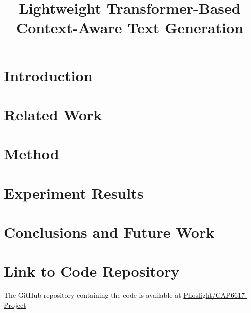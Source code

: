 \documentclass[conference]{IEEEtran}
\begin{document}
\title{Lightweight Transformer-Based Context-Aware Text Generation}


\author{
\and
{}
}

\maketitle

\section{Introduction}\label{sec:introduction}


\section{Related Work}\label{sec:related-work}


\section{Method}\label{sec:method}


\section{Experiment Results}\label{sec:experiment-results}



\section{Conclusions and Future Work}\label{sec:conclusions-and-future-work}



%


\appendices
\section{Link to Code Repository}\label{sec:appendix-code}
The GitHub repository containing the code is available at
\href{https://github.com/Phoslight/CAP6617-Project}{Phoslight/CAP6617-Project}
\end{document}
